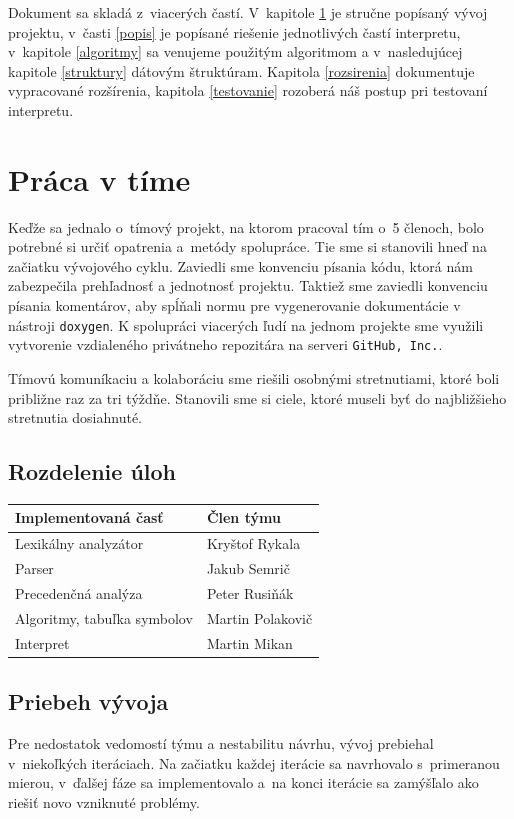 \documentclass[11pt,a4paper]{article}
\begin{document}
	Dokument sa skladá z~viacerých častí. V~kapitole \ref{tim} je stručne popísaný vývoj projektu, v~časti \ref{popis} je popísané riešenie jednotlivých častí interpretu, v~kapitole \ref{algoritmy} sa venujeme použitým algoritmom a v~nasledujúcej kapitole \ref{struktury} dátovým štruktúram. Kapitola \ref{rozsirenia} dokumentuje vypracované rozšírenia, kapitola \ref{testovanie} rozoberá náš postup pri testovaní interpretu.


	\section{Práca v tíme}
	\label{tim}

	Keďže sa jednalo o~tímový projekt, na ktorom pracoval tím o~5 členoch, bolo potrebné si určiť opatrenia a~metódy spolupráce. Tie sme si stanovili hneď na začiatku vývojového cyklu. Zaviedli sme konvenciu písania kódu, ktorá nám zabezpečila prehľadnosť a jednotnosť projektu. Taktiež sme zaviedli konvenciu písania komentárov, aby spĺňali normu pre vygenerovanie dokumentácie v nástroji \texttt{doxygen}. K spolupráci viacerých ľudí na jednom projekte sme využili vytvorenie vzdialeného privátneho repozitára na serveri \texttt{GitHub, Inc.}.

	Tímovú komuníkaciu a kolaboráciu sme riešili osobnými stretnutiami, ktoré boli približne raz za tri týždňe. Stanovili sme si ciele, ktoré museli byť do najbližšieho stretnutia dosiahnuté.

	\subsection{Rozdelenie úloh}
	\begin{center}
		\begin{tabular}{|l|l|}
			\hline
			\large{\textbf{Implementovaná časť}} & \large{\textbf{Člen týmu}}\\
			\hline
			\hline
			Lexikálny analyzátor & Kryštof Rykala \\
			\hline
			Parser & Jakub Semrič \\
			\hline
			Precedenčná analýza & Peter Rusiňák \\
			\hline
			Algoritmy, tabuľka symbolov & Martin Polakovič \\
			\hline
			Interpret & Martin Mikan \\
			\hline
		\end{tabular}
	\end{center}

	\subsection{Priebeh vývoja}
	\label{vyvoj}
	Pre nedostatok vedomostí týmu a nestabilitu návrhu, vývoj prebiehal v~niekoľkých
	iteráciach. Na začiatku každej iterácie sa navrhovalo s~primeranou mierou,
	v~ďalšej fáze sa implementovalo a~na konci iterácie sa zamýšľalo ako riešiť
	novo vzniknuté problémy.
\end{document}
